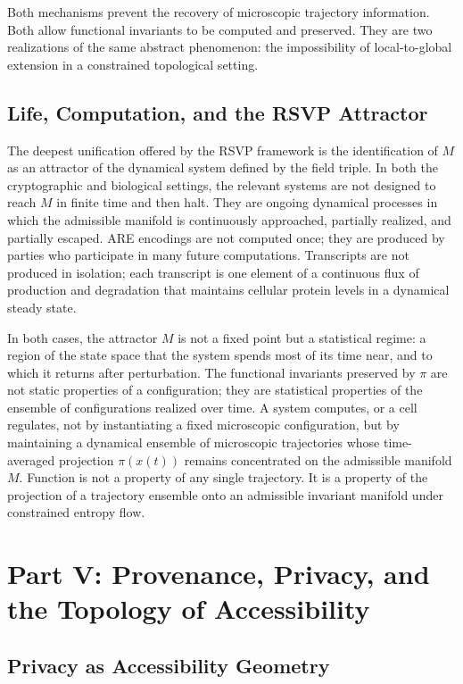 \documentclass[12pt, a4paper]{article}
\theoremstyle{essaystyle}
\begin{document}
Both mechanisms prevent the recovery of microscopic trajectory information. Both allow
functional invariants to be computed and preserved. They are two realizations of the
same abstract phenomenon: the impossibility of local-to-global extension in a
constrained topological setting.

\subsection{Life, Computation, and the RSVP Attractor}

The deepest unification offered by the RSVP framework is the identification of $M$
as an attractor of the dynamical system defined by the field triple. In both the
cryptographic and biological settings, the relevant systems are not designed to reach
$M$ in finite time and then halt. They are ongoing dynamical processes in which the
admissible manifold is continuously approached, partially realized, and partially
escaped. ARE encodings are not computed once; they are produced by parties who
participate in many future computations. Transcripts are not produced in isolation;
each transcript is one element of a continuous flux of production and degradation that
maintains cellular protein levels in a dynamical steady state.

In both cases, the attractor $M$ is not a fixed point but a statistical regime: a
region of the state space that the system spends most of its time near, and to which
it returns after perturbation. The functional invariants preserved by $\pi$ are not
static properties of a configuration; they are statistical properties of the ensemble
of configurations realized over time. A system computes, or a cell regulates, not by
instantiating a fixed microscopic configuration, but by maintaining a dynamical
ensemble of microscopic trajectories whose time-averaged projection $\pi(x(t))$ remains
concentrated on the admissible manifold $M$. Function is not a property of any single
trajectory. It is a property of the projection of a trajectory ensemble onto an
admissible invariant manifold under constrained entropy flow.

\section{Part V: Provenance, Privacy, and the Topology of Accessibility}

\subsection{Privacy as Accessibility Geometry}
\end{document}
